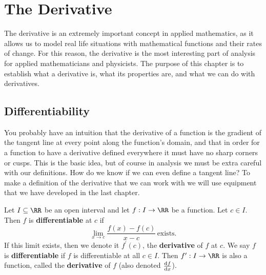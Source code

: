 \documentclass[../real_analysis.tex]{subfiles}
\begin{document}
    \section{The Derivative}\label{sec:the-derivative}
        The derivative is an extremely important concept in applied mathematics, as it allows us to model real life situations with mathematical functions and their rates of change.
        For this reason, the derivative is the most interesting part of analysis for applied mathematicians and physicists.
        The purpose of this chapter is to establish what a derivative is, what its properties are, and what we can do with derivatives.

        \subsection{Differentiability}\label{subsec:differentiability}
            You probably have an intuition that the derivative of a function is the gradient of the tangent line at every point along the function's domain, and that in order for a function to have a derivative defined everywhere it must have no sharp corners or cusps. This is the basic idea, but of course in analysis we must be extra careful with our definitions. How do we know if we can even define a tangent line? To make a definition of the derivative that we can work with we will use equipment that we have developed in the last chapter.
            \begin{definition}
                Let $I\subseteq\RR$ be an open interval and let $f: I\to\RR$ be a function. Let $c\in I$. Then $f$ is \textbf{differentiable} at $c$ if
                \begin{equation}
                    \lim_{x\to c}\frac{f(x)-f(c)}{x-c}\,\text{exists.}
                \end{equation}
                If this limit exists, then we denote it $f^\prime(c)$, the \textbf{derivative} of $f$ at $c$. We say $f$ is \textbf{differentiable} if $f$ is differentiable at all $c\in I$. Then $f^\prime:I\to\RR$ is also a function, called the \textbf{derivative} of $f$ (also denoted $\dv{f}{x}$).
            \end{definition}
\end{document}
